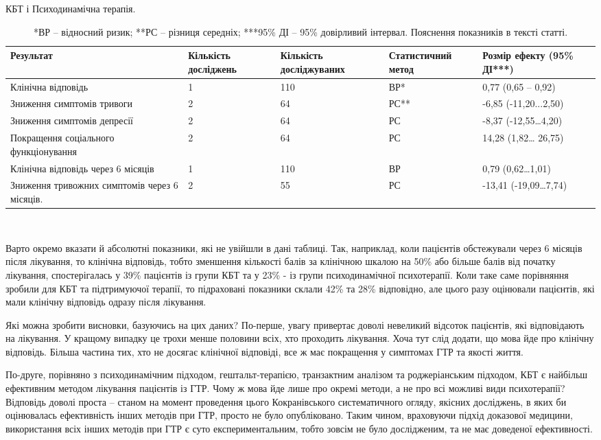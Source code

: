 \documentclass[twocolumn]{article}
\begin{document}
\begin{table*}
\caption{КБТ і Психодинамічна терапія\cite{bib15}.}
\label{tbl4}\centering
\begin{tabulary}{1.0\textwidth}{LLLLL}
\toprule
Результат & Кількість досліджень & Кількість досліджуваних & Статистичний метод & Розмір ефекту (95\% ДІ***) \\ 
\midrule
Клінічна відповідь & 1 & 110 & ВР* & 0,77 (0,65 – 0,92) \\ 
Зниження симптомів тривоги & 2 & 64 & РС** & -6,85 (-11,20...2,50) \\ 
Зниження симптомів депресії & 2 & 64 & РС & -8,37 (-12,55…4,20) \\ 
Покращення соціального функціонування & 2 & 64 & РС & 14,28 (1,82… 26,75) \\ 
Клінічна відповідь через 6 місяців & 1 & 110 & ВР & 0,79 (0,62…1,01) \\ 
Зниження тривожних симптомів через 6 місяців. & 2 & 55 & РС & -13,41 (-19,09…7,74) \\ 
\bottomrule
\end{tabulary}
\\
\caption*{*ВР – відносний ризик; **РС – різниця середніх; ***95\% ДІ – 95\% довірливий інтервал. Пояснення показників в тексті статті.}
\end{table*}
\par Варто окремо вказати й абсолютні показники, які не увійшли в дані таблиці. Так, наприклад, коли пацієнтів обстежували через 6 місяців після лікування, то клінічна відповідь, тобто зменшення кількості балів за клінічною шкалою на 50\% або більше балів від початку лікування, спостерігалась у 39\% пацієнтів із групи КБТ та у 23\% - із групи психодинамічної психотерапії. Коли таке саме порівняння зробили для КБТ та підтримуючої терапії, то підраховані показники склали 42\% та 28\% відповідно, але цього разу оцінювали пацієнтів, які мали клінічну відповідь одразу після лікування.
\par Які можна зробити висновки, базуючись на цих даних? По-перше, увагу привертає доволі невеликий відсоток пацієнтів, які відповідають на лікування. У кращому випадку це трохи менше половини всіх, хто проходить лікування. Хоча тут слід додати, що мова йде про клінічну відповідь. Більша частина тих, хто не досягає клінічної відповіді, все ж має покращення у симптомах ГТР та якості життя.
\par По-друге, порівняно з психодинамічним підходом, гештальт-терапією, транзактним аналізом та роджеріанським підходом, КБТ є найбільш ефективним методом лікування пацієнтів із ГТР. Чому ж мова йде лише про окремі методи, а не про всі можливі види психотерапії? Відповідь доволі проста – станом на момент проведення цього Кокранівського систематичного огляду, якісних досліджень, в яких би оцінювалась ефективність інших методів при ГТР, просто не було опубліковано. Таким чином, враховуючи підхід доказової медицини, використання всіх інших методів при ГТР є суто експериментальним, тобто зовсім не було дослідженим, та не має доведеної ефективності.
\end{document}

